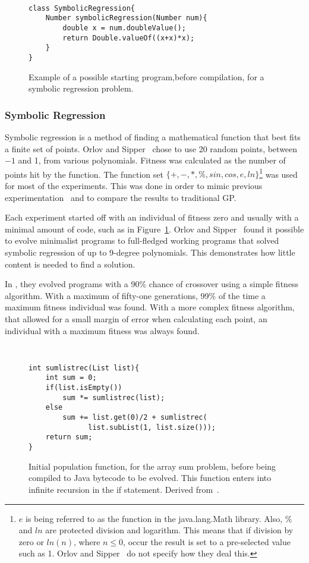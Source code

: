 \documentclass{sig-alternate}
\begin{document}
\begin{figure}
\centering
{\tt
\begin{verbatim}
class SymbolicRegression{
    Number symbolicRegression(Number num){
        double x = num.doubleValue();
        return Double.valueOf((x+x)*x);
    }
}
\end{verbatim}
}
\caption{Example of a possible starting program,before compilation, for a symbolic regression problem.}
\label{regression}
\end{figure}
\subsubsection{Symbolic Regression}
Symbolic regression is a method of finding a mathematical function that best fits a finite set of points. Orlov and Sipper~\cite{FINCH:2011} chose to use 20 random points, between ${-1}$ and 1, from various polynomials. Fitness was calculated as the number of points hit by the function. The function set ${\{+, -, *, \%, sin, cos, e, ln\}}$\footnote{$e$ is being referred to as the function in the java.lang.Math library. Also, $\%$ and $ln$ are protected division and logarithm. This means that if division by zero or $ln(n)$, where $n \le 0$, occur the result is set to a pre-selected value such as 1. Orlov and Sipper~\cite{FINCH:2011} do not specify how they deal this.} was used for most of the experiments. This was done in order to mimic previous experimentation~\cite{koza:1992} and to compare the results to traditional GP.

Each experiment started off with an individual of fitness zero and usually with a minimal amount of code, such as in Figure~\ref{regression}. Orlov and Sipper~\cite{FINCH:2011} found it possible  to evolve minimalist programs to full-fledged working programs that solved symbolic regression of up to 9-degree polynomials. This demonstrates how little content is needed to find a solution.\par

In \cite{FINCH:2011}, they evolved programs with a 90\% chance of crossover using a simple fitness algorithm. With a maximum of fifty-one generations, 99\% of the time a maximum fitness individual was found. With a more complex fitness algorithm, that allowed for a small margin of error when calculating each point, an individual with a maximum fitness was always found. 

\begin{figure}
\centering
{\tt
\begin{verbatim}
int sumlistrec(List list){
    int sum = 0;
    if(list.isEmpty())
        sum *= sumlistrec(list);
    else
        sum += list.get(0)/2 + sumlistrec(
              list.subList(1, list.size()));
    return sum;
}
\end{verbatim}
}

\caption{Initial population function, for the array sum problem, before being compiled to Java bytecode to be evolved. This function enters into infinite recursion in the if statement. Derived from~\cite{FINCH:2011}.}
\label{initial rec}
\end{figure}
\end{document}

